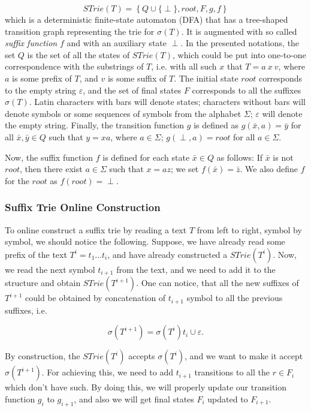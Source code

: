 \documentclass[paper=a4, fontsize=11pt]{scrartcl} %
\numberwithin{equation}{section} %
\numberwithin{figure}{section} %
\numberwithin{table}{section} %
\begin{document}
\begin{equation}
STrie(T) = \left\{Q \cup \{\perp\}, root, F, g, f \right\}
\end{equation}
which is a deterministic finite-state automaton (DFA) that has a tree-shaped transition graph representing the trie for $\sigma(T)$. It is augmented with so called \textit{suffix function} $f$ and with an auxiliary state $\perp$. In the presented notations, the set $Q$ is the set of all the states of $STrie(T)$, which could be put into one-to-one correspondence with the substrings of $T$, i.e. with all such $x$ that $T = a\ x\ v$, where $a$ is some prefix of $T$, and $v$ is some suffix of $T$. The initial state $root$ corresponds to the empty string $\varepsilon$, and the set of final states $F$ corresponds to all the suffixes $\sigma(T)$. Latin characters with bars will denote states; characters without bars will denote symbols or some sequences of symbols from the alphabet $\Sigma$; $\varepsilon$ will denote the empty string. Finally, the transition function $g$ is defined as $g(\bar{x}, a) = \bar{y}$ for all $\bar{x}, \bar{y} \in Q$ such that $y = xa$, where $a \in \Sigma$; $g(\perp, a) = root$ for all $a \in \Sigma$.

\par Now, the suffix function $f$ is defined for each state $\bar{x} \in Q$ as follows: If $\bar{x}$ is not $root$, then there exist $a \in \Sigma$ such that $x = az$; we set $f(\bar{x}) = \bar{z}$. We also define $f$ for the $root$ as $f(root) = \perp$.

\subsubsection{Suffix Trie Online Construction}
To online construct a suffix trie by reading a text $T$ from left to right, symbol by symbol, we should notice the following. Suppose, we have already read some prefix of the text $T^i = t_1 \dots t_i$, and have already constructed a $STrie(T^i)$. Now, we read the next symbol $t_{i+1}$ from the text, and we need to add it to the structure and obtain $STrie(T^{i+1})$. One can notice, that all the new suffixes of $T^{i+1}$ could be obtained by concatenation of $t_{i+1}$ symbol to all the previous suffixes, i.e.

$$
\sigma(T^{i+1}) = \sigma(T^i)t_i \cup \varepsilon.
$$

By construction, the $STrie(T^i)$ accepts $\sigma(T^i)$, and we want to make it accept $\sigma(T^{i+1})$. For achieving this, we need to add $t_{i+1}$ transitions to all the $r \in F_i$ which don't have such. By doing this, we will properly update our transition function $g_i$ to $g_{i+1}$, and also we will get final states $F_i$ updated to $F_{i+1}$.
\end{document}
